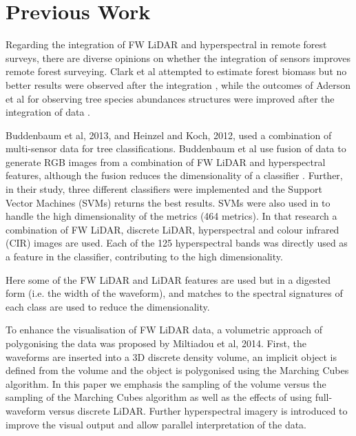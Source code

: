 \documentclass{subfiles}
\begin{document}
	\section{Previous Work}
	
	\par Regarding the integration of FW LiDAR and hyperspectral in remote forest surveys, there are diverse opinions on whether the integration of sensors improves remote forest surveying. Clark et al attempted to estimate forest biomass but no better results were observed after the integration \cite{Clark2011}, while the outcomes of Aderson et al for observing tree species abundances structures were improved after the integration of data \cite{Anderson2008}. 
	
	\par \cite{Buddenbaum2013} Buddenbaum et al, 2013, and \cite{Heinzel2012} Heinzel and Koch, 2012, used a combination of multi-sensor data for tree classifications. Buddenbaum et al use fusion of data to generate RGB images from a combination of FW LiDAR and hyperspectral features, although the fusion reduces the dimensionality of a classifier \cite{Buddenbaum2013}. Further, in their study, three different classifiers were implemented and the Support Vector Machines (SVMs) returns the best results. SVMs were also used in \cite{Heinzel2012} to handle the high dimensionality of the metrics (464 metrics). In that research a combination of FW LiDAR, discrete LiDAR, hyperspectral and colour infrared (CIR) images are used. Each of the 125 hyperspectral bands was directly used as a feature in the classifier, contributing to the high dimensionality. 
	
	\par Here some of the FW LiDAR and LiDAR features are used but in a digested form (i.e. the width of the waveform), and matches to the spectral signatures of each class are used to reduce the dimensionality.
	
	\par To enhance the visualisation of FW LiDAR data, a volumetric approach of polygonising the data was proposed by Miltiadou et al, 2014. First, the waveforms are inserted into a 3D discrete density volume, an implicit object is defined from the volume and the object is polygonised using the Marching Cubes algorithm. In this paper we emphasis the sampling of the volume versus the sampling of the Marching Cubes algorithm as well as the effects of using full-waveform versus discrete LiDAR. Further hyperspectral imagery is introduced to improve the visual output and allow parallel interpretation of the data.
	
\end{document}
